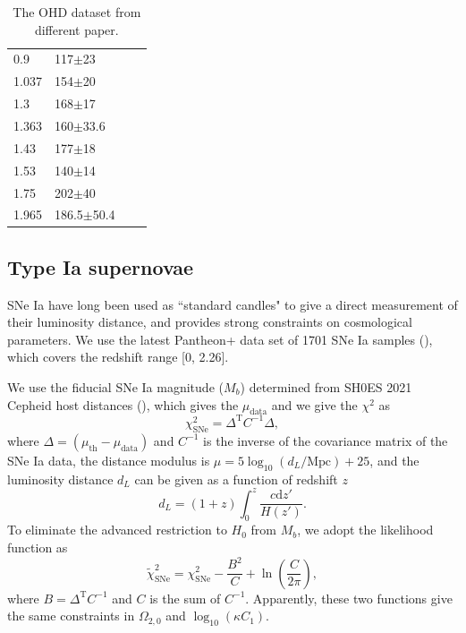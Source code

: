 \documentclass[twocolumn]{aastex631}
\begin{document}
\begin{table}[htbp]
\begin{tabular}{llll}
         0.9 & 117$\pm$23 & \cite{PhysRevD.71.123001} \\
         1.037 & 154$\pm$20 & \cite{M.Moresco_2012} \\
         1.3 & 168$\pm$17 & \cite{PhysRevD.71.123001} \\
         1.363 & 160$\pm$33.6 & \cite{10.1093/mnrasl/slv037} \\
         1.43 & 177$\pm$18 & \cite{PhysRevD.71.123001} \\
         1.53 & 140$\pm$14 & \cite{PhysRevD.71.123001} \\
         1.75 & 202$\pm$40 & \cite{PhysRevD.71.123001} \\
         1.965 & 186.5$\pm$50.4 & \cite{10.1093/mnrasl/slv037} \\
         \hline    
      \end{tabular}
      \caption{The OHD dataset from different paper.}
      \label{tab:1}
   \end{table}

\subsection{Type Ia supernovae}

   SNe Ia have long been used as ``standard candles" to give a direct
   measurement of their luminosity distance, and provides strong constraints
   on cosmological parameters. We use the latest Pantheon+ data set of 1701 
   SNe Ia samples (\cite{Scolnic_2022}), which covers the redshift range [0, 2.26].
   
   We use the fiducial SNe Ia magnitude ($M_b$) determined from SH0ES 2021 Cepheid 
   host distances (\cite{Riess_2022}), which gives the $\mu_{\text{data}}$ and we 
   give the $\chi^2$ as 
   \begin{equation}
      \chi_{\text{SNe}}^2=\Delta^{\text{T}}C^{-1}\Delta,
   \end{equation}
   where $\Delta=(\mu_{\text{th}}-\mu_{\text{data}})$ and $C^{-1}$ is the inverse of the
   covariance matrix of the SNe Ia data, the distance modulus is $\mu=5\log_{10}(d_L/\text{Mpc})+25$, and the
   luminosity distance $d_L$ can be given as a function of redshift $z$
   \begin{equation}
      d_L=(1+z)\int_0^z\frac{c\mathrm{d}z'}{H(z')}.\label{eq:15}
   \end{equation}
   To eliminate the advanced restriction to $H_0$ from $M_b$, we adopt
   the likelihood function as
   \begin{equation}
      \widetilde{\chi}_{\text{SNe}}^2=\chi_{\text{SNe}}^2-\frac{B^2}{C}+\ln\left(\frac{C}{2\pi}\right),
   \end{equation}
   where $B=\Delta^{\text{T}}C^{-1}$ and $C$ is the sum of $C^{-1}$.
   Apparently, these two functions give the same constraints in $\Omega_{2,0}$ and
   $\log_{10}(\kappa C_1)$.
\end{document}
